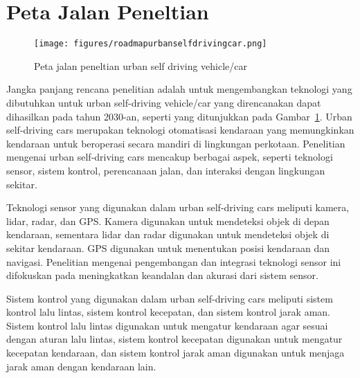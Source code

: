 \section{Peta Jalan Peneltian}
\begin{figure}
    \centering
    \texttt{[image: figures/roadmapurbanselfdrivingcar.png]}
    \caption{Peta jalan peneltian urban self driving vehicle/car}
    \label{fig:roadmap}
\end{figure}

Jangka panjang rencana penelitian adalah untuk mengembangkan teknologi yang dibutuhkan untuk urban self-driving vehicle/car yang direncanakan dapat dihasilkan pada tahun 2030-an, seperti yang ditunjukkan pada Gambar~\ref{fig:roadmap}. Urban self-driving cars merupakan teknologi otomatisasi kendaraan yang memungkinkan kendaraan untuk beroperasi secara mandiri di lingkungan perkotaan. Penelitian mengenai urban self-driving cars mencakup berbagai aspek, seperti teknologi sensor, sistem kontrol, perencanaan jalan, dan interaksi dengan lingkungan sekitar.

Teknologi sensor yang digunakan dalam urban self-driving cars meliputi kamera, lidar, radar, dan GPS. Kamera digunakan untuk mendeteksi objek di depan kendaraan, sementara lidar dan radar digunakan untuk mendeteksi objek di sekitar kendaraan. GPS digunakan untuk menentukan posisi kendaraan dan navigasi. Penelitian mengenai pengembangan dan integrasi teknologi sensor ini difokuskan pada meningkatkan keandalan dan akurasi dari sistem sensor.

Sistem kontrol yang digunakan dalam urban self-driving cars meliputi sistem kontrol lalu lintas, sistem kontrol kecepatan, dan sistem kontrol jarak aman. Sistem kontrol lalu lintas digunakan untuk mengatur kendaraan agar sesuai dengan aturan lalu lintas, sistem kontrol kecepatan digunakan untuk mengatur kecepatan kendaraan, dan sistem kontrol jarak aman digunakan untuk menjaga jarak aman dengan kendaraan lain.


